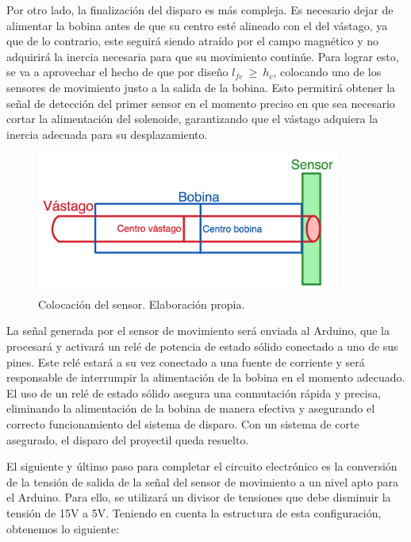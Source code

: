 Por otro lado, la finalización del disparo es más compleja. Es necesario dejar de alimentar la bobina antes de que su centro esté alineado con el del vástago, ya que de lo contrario, este seguirá siendo atraído por el campo magnético y no adquirirá la inercia necesaria para que su movimiento continúe. Para lograr esto, se va a aprovechar el hecho de que por diseño \(l_{fe}~\geq~h_c\), colocando uno de los sensores de movimiento justo a la salida de la bobina. Esto permitirá obtener la señal de detección del primer sensor en el momento preciso en que sea necesario cortar la alimentación del solenoide, garantizando que el vástago adquiera la inercia adecuada para su desplazamiento.

\begin{figure}[H]
    \centering
    \includegraphics[width=10cm]{FigurasMemoria/esquemaJustDisparo.png}
    \caption{Colocación del sensor. Elaboración propia.}
    \label{fig:esquemaJustDisparo} %
\end{figure}

La señal generada por el sensor de movimiento será enviada al Arduino, que la procesará y activará un relé de potencia de estado sólido conectado a uno de sus pines. Este relé estará a su vez conectado a una fuente de corriente y será responsable de interrumpir la alimentación de la bobina en el momento adecuado. El uso de un relé de estado sólido asegura una conmutación rápida y precisa, eliminando la alimentación de la bobina de manera efectiva y asegurando el correcto funcionamiento del sistema de disparo. Con un sistema de corte asegurado, el disparo del proyectil queda resuelto.

El siguiente y último paso para completar el circuito electrónico es la conversión de la tensión de salida de la señal del sensor de movimiento a un nivel apto para el Arduino. Para ello, se utilizará un divisor de tensiones que debe disminuir la tensión de 15V a 5V. Teniendo en cuenta la estructura de esta configuración, obtenemos lo siguiente:

